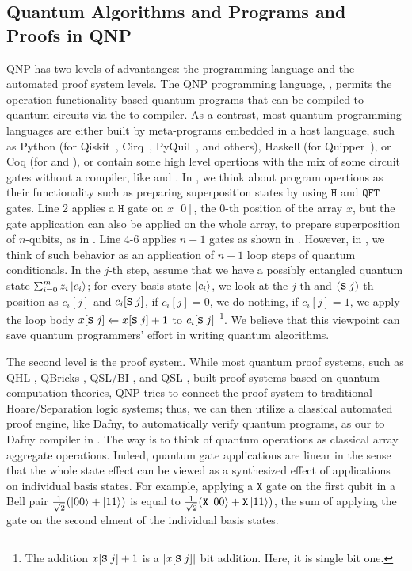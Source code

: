 \subsection{Quantum Algorithms and Programs and Proofs in QNP}\label{sec:qnp-features}

QNP has two levels of advantanges: the programming language and the automated proof system levels.
The QNP programming language, \qafny, permits the operation functionality based quantum programs that can be compiled to quantum circuits via the \qafny to \sqir compiler. As a contrast, most quantum programming languages are either built by meta-programs embedded in a host language, such as Python (for Qiskit~\cite{Qiskit}, Cirq~\cite{cirq}, PyQuil~\cite{PyQuil}, and others), Haskell (for Quipper~\cite{Green2013}), or Coq (for \sqir and \voqc \cite{VOQC}), or contain some high level opertions with the mix of some circuit gates without a compiler, like \cite{sliqlanguage} and \cite{qsharp}.
In \qafny, we think about program opertions as their functionality such as preparing superposition states by using $\texttt{H}$ and $\texttt{QFT}$ gates.  Line 2 applies a $\texttt{H}$ gate on $x[0]$, the $0$-th position of the array $x$, but the gate application can also be applied on the whole array, to prepare superposition of $n$-qubits, as in . Line 4-6 applies $n-1$  gates as shown in . However, in \qafny, we think of such behavior as an application of $n-1$ loop steps of quantum conditionals. In the $j$-th step, assume that we have a possibly entangled quantum state $\schii{m}{z_i}{c_i}$; for every basis state $\left\vert{c_i}\right\rangle$, we look at the $j$-th and $(\texttt{S}\;j)$-th position as $c_i[j]$ and $c_i[\texttt{S}\;j]$, if $c_i[j]=0$, we do nothing, if $c_i[j]=1$, we apply the loop body ${x[\texttt{S}\;j]} \xleftarrow{} {x[\texttt{S}\;j]+1}$ to $c_i[\texttt{S}\;j]$ \footnote{The addition $x[\texttt{S}\;j]+1$ is a $|x[\texttt{S}\;j]|$ bit addition. Here, it is single bit one. }. 
We believe that this viewpoint can save quantum programmers' effort in writing quantum algorithms.

The second level is the proof system. While most quantum proof systems, such as QHL \cite{qhoreusage}, QBricks \cite{qbricks},  QSL/BI \cite{10.1109/LICS52264.2021.9470673}, and QSL \cite{quantumseparation}, built proof systems based on quantum computation theories, QNP tries to connect the \qafny proof system to traditional Hoare/Separation logic systems; thus, we can then utilize a classical automated proof engine, like Dafny, to automatically verify quantum programs, as our \qafny to Dafny compiler in .
The way is to think of \qafny quantum operations as classical array aggregate operations. 
Indeed, quantum gate applications are linear in the sense that the whole state effect can be viewed as a synthesized effect of applications on individual basis states. For example, applying a $\texttt{X}$ gate on the first qubit in a Bell pair $\frac{1}{\sqrt{2}}(\left\vert{00}\right\rangle + \left\vert{11}\right\rangle)$ is equal to $\frac{1}{\sqrt{2}}(\texttt{X}\left\vert{00}\right\rangle + \texttt{X}\left\vert{11}\right\rangle)$, the sum of applying the gate on the second elment of the individual basis states.

